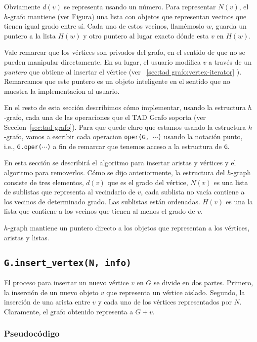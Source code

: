 \documentclass[%
    a4paper,%
    12pt,%
    twoside,%
    openright,%
    halfparskip,%
    cleardoubleempty,%
    bigheadings,%
    titlepage,%
    headsepline%
]{scrbook}
\begin{document}
 Obviamente $d(v)$ se representa usando un número. Para representar $N(v)$, el $h$-grafo mantiene (ver Figura) una lista con objetos que representan vecinos que tienen igual grado entre sí. Cada uno de estos vecinos, llamémoslo $w$,  guarda un puntero a la lista $H(w)$ y otro puntero al lugar exacto dónde esta $v$ en $H(w)$.

Vale remarcar que los vértices son privados del grafo, en el sentido de que no se pueden manipular directamente.  En su lugar, el usuario modifica $v$ a través de un \emph{puntero} que obtiene al insertar el vértice (ver ~\ref{sec:tad grafo:vertex-iterator} ).  Remarcamos que este puntero es un objeto inteligente en el sentido que no muestra la implementacion al usuario.

En el resto de esta sección describimos cómo implementar, usando la estructura $h$-grafo, cada una de las operaciones que el TAD Grafo soporta (ver Seccion~\ref{sec:tad grafo}).  Para que quede claro que estamos usando la estructura $h$-grafo, vamos a escribir cada operacion \texttt{oper(G, $\cdots$)} usando la notación punto, i.e., \texttt{G.oper($\cdots$)} a fin de remarcar que tenemos acceso a la estructura de \texttt{G}.

En esta sección se describirá el algoritmo para insertar aristas y vértices y el algoritmo para removerlos.
Cómo se dijo anteriormente, la estructura del $h$-graph consiste de tres elementos, $d(v)$ que es el grado del vértice, $N(v)$ es una lista de sublistas que representa al vecindario de $v$, cada sublista no vacía contiene a los vecinos de determinado grado. Las sublistas están ordenadas. $H(v)$ es una la lista que contiene a los vecinos que tienen al menos el grado de $v$.

$h$-graph mantiene un puntero directo a los objetos que representan a los vértices, aristas y listas.


\subsection{\texttt{G.insert\_vertex(N, info)}}
\label{sec:hgraph:insert_vertex}

El proceso para insertar un nuevo vértice $v$ en $G$ se divide en dos partes.  Primero, la inserción de un nuevo objeto $v$ que representa un vértice aislado.  Segundo, la inserción de una arista entre $v$ y cada uno de los vértices representados por $N$.  Claramente, el grafo obtenido representa a $G + v$.

\subsubsection*{Pseudocódigo}
\end{document}
